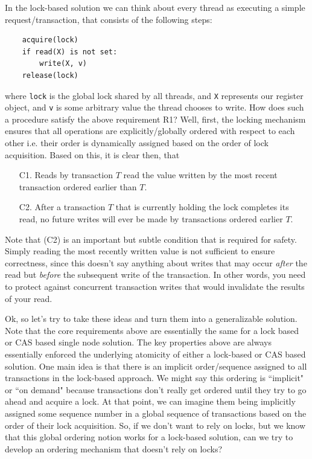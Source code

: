 \documentclass[10pt,a4paper]{article}
\begin{document}
In the lock-based solution we can think about every thread as executing a simple request/transaction, that consists of the following steps:
\begin{verbatim}
    acquire(lock)
    if read(X) is not set:
        write(X, v)
    release(lock)
\end{verbatim}
where \verb|lock| is the global lock shared by all threads, and \verb|X| represents our register object, and \verb|v| is some arbitrary value the thread chooses to write. How does such a procedure satisfy the above requirement R1? Well, first, the locking mechanism ensures that all operations are explicitly/globally ordered with respect to each other i.e. their order is dynamically assigned based on the order of lock acquisition. Based on this, it is clear then, that
\begin{enumerate}
    \item[C1.] Reads by transaction $T$ read the value written by the most recent transaction ordered earlier than $T$.
    \item[C2.] After a transaction $T$ that is currently holding the lock completes its read, no future writes will ever be made by transactions ordered earlier $T$.
\end{enumerate}
Note that (C2) is an important but subtle condition that is required for safety. Simply reading the most recently written value is not sufficient to ensure correctness, since this doesn't say anything about writes that may occur \textit{after} the read but \textit{before} the subsequent write of the transaction. In other words, you need to protect against concurrent transaction writes that would invalidate the results of your read.

Ok, so let's try to take these ideas and turn them into a generalizable solution. Note that the core requirements above are essentially the same for a lock based or CAS based single node solution. The key properties above are always essentially enforced the underlying atomicity of either a lock-based or CAS based solution. One main idea is that there is an implicit order/sequence assigned to all transactions in the lock-based approach. We might say this ordering is ``implicit" or ``on demand" because transactions don't really get ordered until they try to go ahead and acquire a lock. At that point, we can imagine them being implicitly assigned some sequence number in a global sequence of transactions based on the order of their lock acquisition. So, if we don't want to rely on locks, but we know that this global ordering notion works for a lock-based solution, can we try to develop an ordering mechanism that doesn't rely on locks? 
\end{document}

